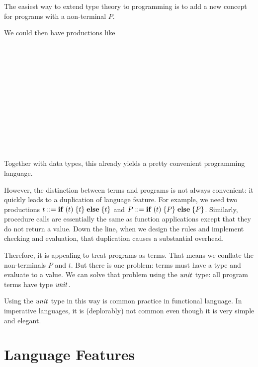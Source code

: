 The easiest way to extend type theory to programming is to add a new concept for programs with a non-terminal $P$.

We could then have productions like
\begin{commgrammar}
\\
\\
\\
\\
\\
\\
\\
\\
\\
\\
\\
\end{commgrammar}

Together with data types, this already yields a pretty convenient programming language.

However, the distinction between terms and programs is not always convenient: it quickly leads to a duplication of language feature.
For example, we need two productions $t\bbc \aifelseI{t}{t}{t}$ and $P\bbc \aifelseI{t}{P}{P}$.
Similarly, procedure calls are essentially the same as function applications except that they do not return a value.
Down the line, when we design the rules and implement checking and evaluation, that duplication causes a substantial overhead.
\medskip

Therefore, it is appealing to treat programs as terms.
That means we conflate the non-terminals $P$ and $t$.
But there is one problem: terms must have a type and evaluate to a value.
We can solve that problem using the $\mathit{unit}$ type: all program terms have type $\mathit{unit}$.

Using the $\mathit{unit}$ type in this way is common practice in functional language.
In imperative languages, it is (deplorably) not common even though it is very simple and elegant.

\section{Language Features}

